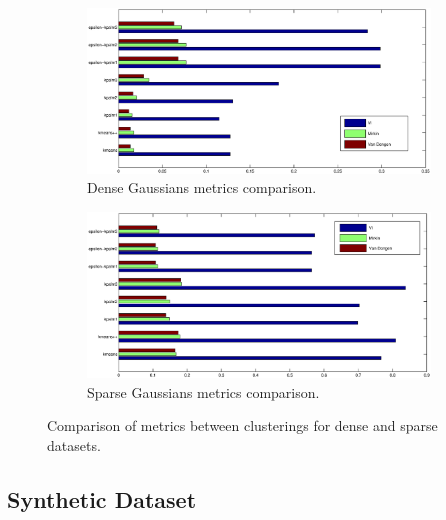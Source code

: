 \documentclass[12pt]{article}
\numberwithin{equation}{section}
\begin{document}
\begin{figure}
    \centering
    \begin{subfigure}[b]{0.95\textwidth}
        \includegraphics[width=\textwidth]{dense_gaussians_metrics2}
        \caption{Dense Gaussians metrics comparison.}
        \label{fig:dense_gaussians_metrics}
    \end{subfigure}
    \quad
    \begin{subfigure}[b]{0.95\textwidth}
        \includegraphics[width=\textwidth]{sparse_gaussians_metrics2}
        \caption{Sparse Gaussians metrics comparison.}
        \label{fig:sparse_gaussians_metrics}
    \end{subfigure}
    \caption{Comparison of metrics between clusterings for dense and sparse datasets.}
    \label{fig:gaussians_metrics}
\end{figure}

\subsection{Synthetic Dataset}
\end{document}
